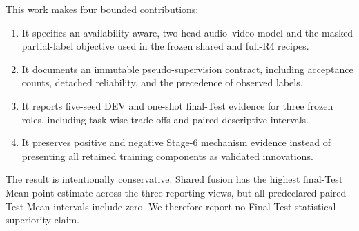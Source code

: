 This work makes four bounded contributions:

\begin{enumerate}[leftmargin=*,nosep]
\item It specifies an availability-aware, two-head audio--video model and the masked partial-label objective used in the frozen shared and full-R4 recipes.
\item It documents an immutable pseudo-supervision contract, including acceptance counts, detached reliability, and the precedence of observed labels.
\item It reports five-seed DEV and one-shot final-Test evidence for three frozen roles, including task-wise trade-offs and paired descriptive intervals.
\item It preserves positive and negative Stage-6 mechanism evidence instead of presenting all retained training components as validated innovations.
\end{enumerate}

The result is intentionally conservative. Shared fusion has the highest final-Test Mean point estimate across the three reporting views, but all predeclared paired Test Mean intervals include zero. We therefore report no Final-Test statistical-superiority claim.
